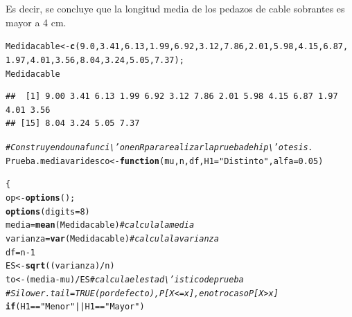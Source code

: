 \documentclass[12pt,letterpaper]{article}\usepackage[]{graphicx}\usepackage[]{color}
\makeatletter
\newcommand{\hlnum}[1]{\textcolor[rgb]{0.686,0.059,0.569}{#1}}%
\newcommand{\hlstr}[1]{\textcolor[rgb]{0.192,0.494,0.8}{#1}}%
\newcommand{\hlcom}[1]{\textcolor[rgb]{0.678,0.584,0.686}{\textit{#1}}}%
\newcommand{\hlopt}[1]{\textcolor[rgb]{0,0,0}{#1}}%
\newcommand{\hlstd}[1]{\textcolor[rgb]{0.345,0.345,0.345}{#1}}%
\newcommand{\hlkwa}[1]{\textcolor[rgb]{0.161,0.373,0.58}{\textbf{#1}}}%
\newcommand{\hlkwb}[1]{\textcolor[rgb]{0.69,0.353,0.396}{#1}}%
\newcommand{\hlkwc}[1]{\textcolor[rgb]{0.333,0.667,0.333}{#1}}%
\newcommand{\hlkwd}[1]{\textcolor[rgb]{0.737,0.353,0.396}{\textbf{#1}}}%
\newenvironment{kframe}{%
 \def\at@end@of@kframe{}%
 \ifinner\ifhmode%
  \def\at@end@of@kframe{\end{minipage}}%
  \begin{minipage}{\columnwidth}%
 \fi\fi%
 \def\FrameCommand##1{\hskip\@totalleftmargin \hskip-\fboxsep
 \colorbox{shadecolor}{##1}\hskip-\fboxsep
     \hskip-\linewidth \hskip-\@totalleftmargin \hskip\columnwidth}%
 \MakeFramed {\advance\hsize-\width
   \@totalleftmargin\z@ \linewidth\hsize
   \@setminipage}}%
 {\par\unskip\endMakeFramed%
 \at@end@of@kframe}
\newenvironment{knitrout}{}{} %
\makeatother
\begin{document}
Es decir, se concluye que la longitud media de los pedazos de cable sobrantes es mayor a 4 cm.
\begin{knitrout}
\color{fgcolor}\begin{kframe}
\begin{alltt}
\hlstd{Medidacable} \hlkwb{<-} \hlkwd{c}\hlstd{(}\hlnum{9.0}\hlstd{,} \hlnum{3.41}\hlstd{,} \hlnum{6.13}\hlstd{,} \hlnum{1.99}\hlstd{,} \hlnum{6.92}\hlstd{,} \hlnum{3.12}\hlstd{,} \hlnum{7.86}\hlstd{,} \hlnum{2.01}\hlstd{,} \hlnum{5.98}\hlstd{,} \hlnum{4.15}\hlstd{,} \hlnum{6.87}\hlstd{,}
                 \hlnum{1.97}\hlstd{,} \hlnum{4.01}\hlstd{,} \hlnum{3.56}\hlstd{,} \hlnum{8.04}\hlstd{,} \hlnum{3.24}\hlstd{,} \hlnum{5.05}\hlstd{,} \hlnum{7.37}\hlstd{);}
\hlstd{Medidacable}
\end{alltt}
\begin{verbatim}
##  [1] 9.00 3.41 6.13 1.99 6.92 3.12 7.86 2.01 5.98 4.15 6.87 1.97 4.01 3.56
## [15] 8.04 3.24 5.05 7.37
\end{verbatim}
\begin{alltt}
\hlcom{# Construyendo una funci\textbackslash{}'on en R para realizar la prueba de hip\textbackslash{}'otesis.}
\hlstd{Prueba.mediavaridesco} \hlkwb{<-} \hlkwa{function}\hlstd{(}\hlkwc{mu}\hlstd{,} \hlkwc{n}\hlstd{,} \hlkwc{df}\hlstd{,} \hlkwc{H1}\hlstd{=}\hlstr{"Distinto"}\hlstd{,} \hlkwc{alfa}\hlstd{=}\hlnum{0.05}\hlstd{)}

\hlstd{\{}
\hlstd{op} \hlkwb{<-} \hlkwd{options}\hlstd{();}
\hlkwd{options}\hlstd{(}\hlkwc{digits}\hlstd{=}\hlnum{8}\hlstd{)}
\hlstd{media}\hlkwb{=}\hlkwd{mean}\hlstd{(Medidacable)} \hlcom{#calcula la media}
\hlstd{varianza}\hlkwb{=}\hlkwd{var}\hlstd{(Medidacable)} \hlcom{#calcula la varianza}
\hlstd{df}\hlkwb{=}\hlstd{n}\hlopt{-}\hlnum{1}
\hlstd{ES} \hlkwb{<-} \hlkwd{sqrt}\hlstd{((varianza)}\hlopt{/}\hlstd{n)}
\hlstd{to} \hlkwb{<-} \hlstd{(media}\hlopt{-}\hlstd{mu)}\hlopt{/}\hlstd{ES} \hlcom{#calcula el estad\textbackslash{}'istico de prueba }
\hlcom{# Si lower.tail = TRUE (por defecto), P[X <= x], en otro caso P[X > x] }
\hlkwa{if} \hlstd{(H1} \hlopt{==} \hlstr{"Menor"} \hlopt{||} \hlstd{H1} \hlopt{==} \hlstr{"Mayor"}\hlstd{)}


\end{alltt}
\end{kframe}
\end{knitrout}
\end{document}
